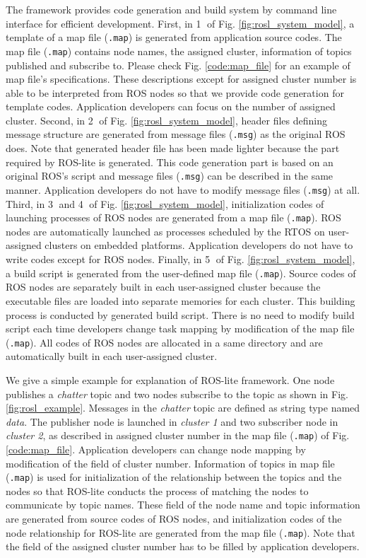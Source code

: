 The framework provides code generation and build system by command line interface for efficient development.
First, in \textcircled{\scriptsize 1} of Fig. \ref{fig:rosl_system_model}, a template of a map file (\texttt{.map}) is generated from application source codes.
The map file (\texttt{.map}) contains node names, the assigned cluster, information of topics published and subscribe to.
Please check Fig. \ref{code:map_file} for an example of map file's specifications.
These descriptions except for assigned cluster number is able to be interpreted from ROS nodes so that we provide code generation for template codes.
Application developers can focus on the number of assigned cluster.
Second, in \textcircled{\scriptsize 2} of Fig. \ref{fig:rosl_system_model}, header files defining message structure are generated from message files (\texttt{.msg}) as the original ROS does.
Note that generated header file has been made lighter because the part required by ROS-lite is generated.
This code generation part is based on an original ROS's script and message files (\texttt{.msg}) can be described in the same manner.
Application developers do not have to modify message files (\texttt{.msg}) at all.
Third, in \textcircled{\scriptsize 3} and \textcircled{\scriptsize 4} of Fig. \ref{fig:rosl_system_model}, initialization codes of launching processes of ROS nodes are generated from a map file (\texttt{.map}).
ROS nodes are automatically launched as processes scheduled by the RTOS on user-assigned clusters on embedded platforms.
Application developers do not have to write codes except for ROS nodes.
Finally, in \textcircled{\scriptsize 5} of Fig. \ref{fig:rosl_system_model}, a build script is generated from the user-defined map file (\texttt{.map}).
Source codes of ROS nodes are separately built in each user-assigned cluster because the executable files are loaded into separate memories for each cluster.
This building process is conducted by generated build script.
There is no need to modify build script each time developers change task mapping by modification of the map file (\texttt{.map}).
All codes of ROS nodes are allocated in a same directory and are automatically built in each user-assigned cluster.

We give a simple example for explanation of ROS-lite framework.
One node publishes a \emph{chatter} topic and two nodes subscribe to the topic as shown in Fig. \ref{fig:rosl_example}.
Messages in the \emph{chatter} topic are defined as string type named \emph{data}.
The publisher node is launched in \emph{cluster 1} and two subscriber node in \emph{cluster 2}, as described in assigned cluster number in the map file (\texttt{.map}) of Fig. \ref{code:map_file}.
Application developers can change node mapping by modification of the field of cluster number.
Information of topics in map file (\texttt{.map}) is used for initialization of the relationship between the topics and the nodes so that ROS-lite conducts the process of matching the nodes to communicate by topic names.
These field of the node name and topic information are generated from source codes of ROS nodes, and initialization codes of the node relationship for ROS-lite are generated from the map file (\texttt{.map}).
Note that the field of the assigned cluster number has to be filled by application developers.


